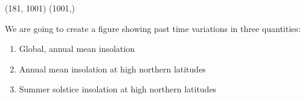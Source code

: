 \documentclass[a4paper,10pt,english]{sphinxmanual}
\begin{document}
\begin{OriginalVerbatim}[commandchars=\\\{\}]
(181, 1001)
(1001,)
\end{OriginalVerbatim}
We are going to create a figure showing past time variations in three
quantities:
\begin{enumerate}
\item {} 
Global, annual mean insolation

\item {} 
Annual mean insolation at high northern latitudes

\item {} 
Summer solstice insolation at high northern latitudes

\end{enumerate}
\end{document}
